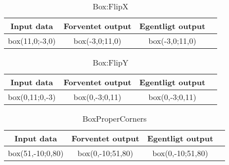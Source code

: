 \begin{table}[ht]
	\caption{Box:FlipX}
	\centering
	\begin{tabular}{c c c c}
		\hline\hline
		Input data & Forventet output & Egentligt output \\ [0.5ex]
		\hline
		box(11,0;-3,0) & box(-3,0;11,0) & box(-3,0;11,0)\\
		\hline
	\end{tabular}
	\label{table:boxFlipX}
\end{table}

\begin{table}[ht]
	\caption{Box:FlipY}
	\centering
	\begin{tabular}{c c c c}
		\hline\hline
		Input data & Forventet output & Egentligt output \\ [0.5ex]
		\hline
		box(0,11;0,-3) & box(0,-3;0,11) & box(0,-3;0,11)\\
		\hline
	\end{tabular}
	\label{table:boxFlipY}
\end{table}

\begin{table}[ht]
	\caption{BoxProperCorners}
	\centering
	\begin{tabular}{c c c c}
		\hline\hline
		Input data & Forventet output & Egentligt output \\ [0.5ex]
		\hline
		box(51,-10;0,80) & box(0,-10;51,80) & box(0,-10;51,80)\\
		\hline
	\end{tabular}
	\label{table:boxProperCorners}
\end{table}